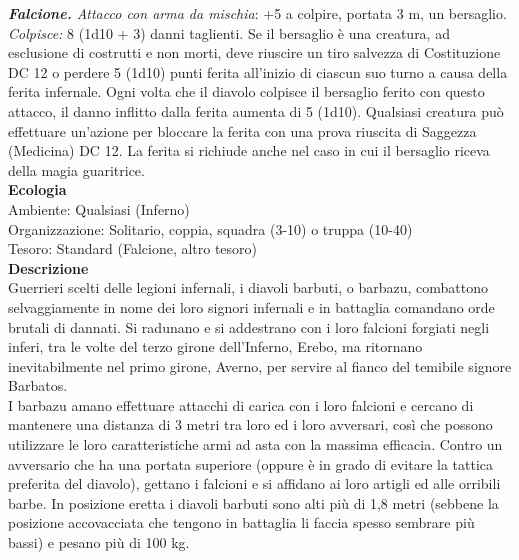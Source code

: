 \begin{multicols}{2}
\emph{\textbf{Falcione.} Attacco con arma da mischia}: +5 a colpire, portata 3 m, un bersaglio.
\emph{Colpisce:} 8 (1d10 + 3) danni taglienti. Se il bersaglio è una creatura, ad esclusione di costrutti e non morti, deve riuscire un tiro salvezza di Costituzione DC 12 o perdere 5 (1d10) punti ferita all'inizio di ciascun suo turno a causa della ferita infernale. Ogni volta che il diavolo colpisce il bersaglio ferito con questo attacco, il  danno inflitto dalla ferita aumenta di 5 (1d10). Qualsiasi creatura può effettuare un'azione per bloccare la ferita con una prova riuscita di Saggezza (Medicina) DC 12. La ferita si richiude anche nel caso in cui il bersaglio riceva della magia guaritrice.\\
\textbf{Ecologia}\\
Ambiente: Qualsiasi (Inferno)\\
Organizzazione: Solitario, coppia, squadra (3-10) o truppa (10-40)\\
Tesoro: Standard (Falcione, altro tesoro)\\
\textbf{Descrizione}\\
Guerrieri scelti delle legioni infernali, i diavoli barbuti, o barbazu, combattono selvaggiamente in nome dei loro signori infernali e in battaglia comandano orde brutali di dannati. Si radunano e si addestrano con i loro falcioni forgiati negli inferi, tra le volte del terzo girone dell’Inferno, Erebo, ma ritornano inevitabilmente nel primo girone, Averno, per servire al fianco del temibile signore Barbatos.\\
I barbazu amano effettuare attacchi di carica con i loro falcioni e cercano di mantenere una distanza di 3 metri tra loro ed i loro avversari, così che possono utilizzare le loro caratteristiche armi ad asta con la massima efficacia. Contro un avversario che ha una portata superiore (oppure è in grado di evitare la tattica preferita del diavolo), gettano i falcioni e si affidano ai loro artigli ed alle orribili barbe. In posizione eretta i diavoli barbuti sono alti più di 1,8 metri (sebbene la posizione accovacciata che tengono in battaglia li faccia spesso sembrare più bassi) e pesano più di 100 kg.\\


\end{multicols}
